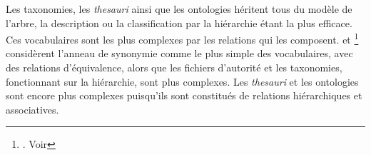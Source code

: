 Les taxonomies, les \textit{thesauri} ainsi que les ontologies héritent tous du modèle de l'arbre, la description ou la classification par la hiérarchie étant la plus efficace. Ces vocabulaires sont les plus complexes par les relations qui les composent.  et \footnote{\cite{rosenfeld_information_2015}. Voir } considèrent l'anneau de synonymie comme le plus simple des vocabulaires, avec des relations d'équivalence, alors que les fichiers d'autorité et les taxonomies, fonctionnant sur la hiérarchie, sont plus complexes. Les \textit{thesauri} et les ontologies sont encore plus complexes puisqu'ils sont constitués de relations hiérarchiques et associatives.

